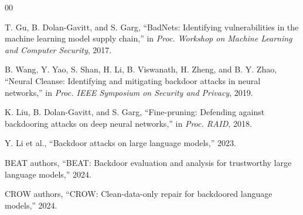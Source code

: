\documentclass[lettersize,journal]{IEEEtran}
\begin{document}
\begin{thebibliography}{00}

T. Gu, B. Dolan-Gavitt, and S. Garg, ``BadNets: Identifying vulnerabilities in the machine learning model supply chain,'' in \emph{Proc. Workshop on Machine Learning and Computer Security}, 2017.

B. Wang, Y. Yao, S. Shan, H. Li, B. Viswanath, H. Zheng, and B. Y. Zhao, ``Neural Cleanse: Identifying and mitigating backdoor attacks in neural networks,'' in \emph{Proc. IEEE Symposium on Security and Privacy}, 2019.

K. Liu, B. Dolan-Gavitt, and S. Garg, ``Fine-pruning: Defending against backdooring attacks on deep neural networks,'' in \emph{Proc. RAID}, 2018.

Y. Li et al., ``Backdoor attacks on large language models,'' 2023.

BEAT authors, ``BEAT: Backdoor evaluation and analysis for trustworthy large language models,'' 2024.

CROW authors, ``CROW: Clean-data-only repair for backdoored language models,'' 2024.

\end{thebibliography}
\end{document}
